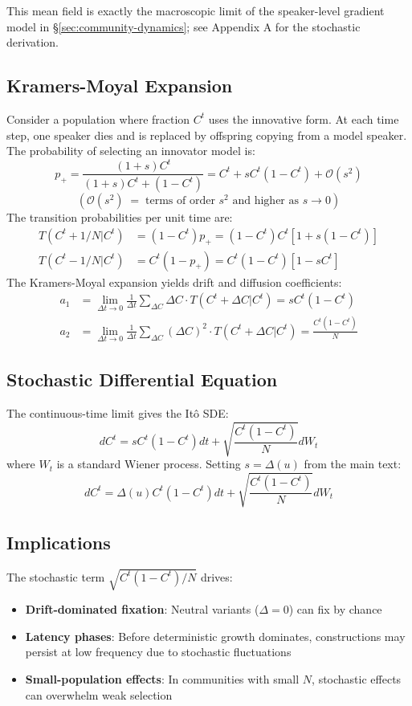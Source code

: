 \documentclass[12pt]{article}
\begin{document}
This mean field is exactly the macroscopic limit of the speaker-level gradient model in §\ref{sec:community-dynamics}; see Appendix A for the stochastic derivation.


\subsection{Kramers-Moyal Expansion}

Consider a population where fraction $C^t$ uses the innovative form. At each time step, one speaker dies and is replaced by offspring copying from a model speaker. The probability of selecting an innovator model is:
$$p_+ = \frac{(1+s)C^t}{(1+s)C^t + (1-C^t)} = C^t + sC^t(1-C^t) + \mathcal{O}(s^2)$$
\[
  (\mathcal{O}(s^{2}) \;=\; \text{terms of order } s^{2} \text{ and higher as } s \to 0)
\]
The transition probabilities per unit time are:
\begin{align}
T(C^t + 1/N | C^t) &= (1-C^t)p_+ = (1-C^t)C^t[1 + s(1-C^t)]\\
T(C^t - 1/N | C^t) &= C^t(1-p_+) = C^t(1-C^t)[1 - sC^t]
\end{align}
The Kramers-Moyal expansion yields drift and diffusion coefficients:
\begin{align}
a_1 &= \lim_{\Delta t \to 0} \frac{1}{\Delta t}\sum_{\Delta C} \Delta C \cdot T(C^t + \Delta C | C^t) = sC^t(1-C^t)\\
a_2 &= \lim_{\Delta t \to 0} \frac{1}{\Delta t}\sum_{\Delta C} (\Delta C)^2 \cdot T(C^t + \Delta C | C^t) = \frac{C^t(1-C^t)}{N}
\end{align}

\subsection{Stochastic Differential Equation}

The continuous-time limit gives the Itô SDE:
$$dC^t = sC^t(1-C^t)dt + \sqrt{\frac{C^t(1-C^t)}{N}}dW_t$$
where $W_t$ is a standard Wiener process. Setting $s = \Delta(u)$ from the main text:
$$dC^t = \Delta(u)C^t(1-C^t)dt + \sqrt{\frac{C^t(1-C^t)}{N}}dW_t$$

\subsection{Implications}

The stochastic term $\sqrt{C^t(1-C^t)/N}$ drives:
\begin{itemize}
\item \textbf{Drift-dominated fixation}: Neutral variants ($\Delta = 0$) can fix by chance
\item \textbf{Latency phases}: Before deterministic growth dominates, constructions may persist at low frequency due to stochastic fluctuations
\item \textbf{Small-population effects}: In communities with small $N$, stochastic effects can overwhelm weak selection
\end{itemize}
\end{document}
